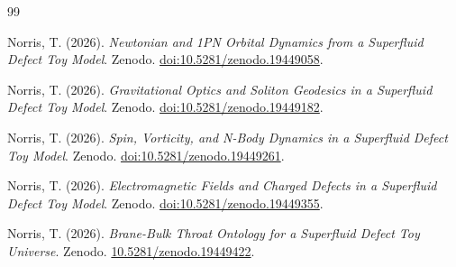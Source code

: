 \documentclass[11pt]{article}
\begin{document}
\begin{thebibliography}{99}

Norris, T. (2026).
\newblock \emph{Newtonian and 1PN Orbital Dynamics from a Superfluid Defect Toy Model}.
\newblock Zenodo.
\newblock \href{https://doi.org/10.5281/zenodo.19449058}{doi:10.5281/zenodo.19449058}.

Norris, T. (2026).
\newblock \emph{Gravitational Optics and Soliton Geodesics in a Superfluid Defect Toy Model}.
\newblock Zenodo.
\newblock \href{https://doi.org/10.5281/zenodo.19449182}{doi:10.5281/zenodo.19449182}.

Norris, T. (2026).
\newblock \emph{Spin, Vorticity, and N-Body Dynamics in a Superfluid Defect Toy Model}.
\newblock Zenodo.
\newblock \href{https://doi.org/10.5281/zenodo.19449261}{doi:10.5281/zenodo.19449261}.

Norris, T. (2026).
\newblock \emph{Electromagnetic Fields and Charged Defects in a Superfluid Defect Toy Model}.
\newblock Zenodo.
\newblock \href{https://doi.org/10.5281/zenodo.19449355}{doi:10.5281/zenodo.19449355}.

Norris, T. (2026).
\newblock \emph{Brane-Bulk Throat Ontology for a Superfluid Defect Toy Universe}.
\newblock Zenodo.
\newblock \href{https://doi.org/10.5281/zenodo.19449422}{10.5281/zenodo.19449422}.

\end{thebibliography}
\end{document}
